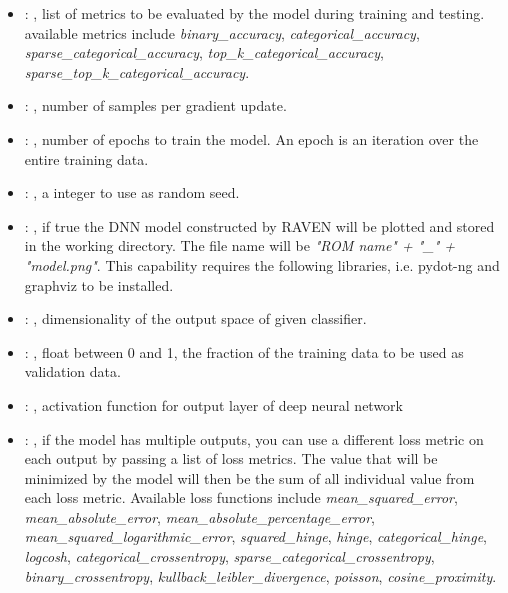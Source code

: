 \begin{itemize}
    \item {}: , 
      list of metrics to be evaluated by         the model during training and testing. available
      metrics include         \textit{binary\_accuracy}, \textit{categorical\_accuracy},
      \textit{sparse\_categorical\_accuracy},         \textit{top\_k\_categorical\_accuracy},
      \textit{sparse\_top\_k\_categorical\_accuracy}.

    \item {}: , 
      number of samples per gradient update.

    \item {}: , 
      number of epochs to train the model. An epoch         is an iteration over the entire training
      data.

    \item {}: , 
      a integer to use as random seed.

    \item {}: , 
      if true the DNN model constructed by RAVEN will be         plotted and stored in the working
      directory. The file name will be \textit{"ROM name" + "\_" + "model.png"}.         \nb This
      capability requires the following libraries, i.e. pydot-ng and graphviz to be installed.

    \item {}: , 
      dimensionality of the output space of given classifier.

    \item {}: , 
      float between 0 and 1, the fraction of the training data to         be used as validation
      data.

    \item {}: , 
      activation function for output layer of deep neural network

    \item {}: , 
      if the model has multiple outputs, you can use a different         loss metric on each output
      by passing a list of loss metrics. The value that will be minimized by the model will then
      be the sum of all individual value from each loss metric. Available loss functions include
      \textit{mean\_squared\_error},         \textit{mean\_absolute\_error},
      \textit{mean\_absolute\_percentage\_error}, \textit{mean\_squared\_logarithmic\_error},
      \textit{squared\_hinge}, \textit{hinge}, \textit{categorical\_hinge}, \textit{logcosh},
      \textit{categorical\_crossentropy},         \textit{sparse\_categorical\_crossentropy},
      \textit{binary\_crossentropy}, \textit{kullback\_leibler\_divergence},
      \textit{poisson}, \textit{cosine\_proximity}.


\end{itemize}
